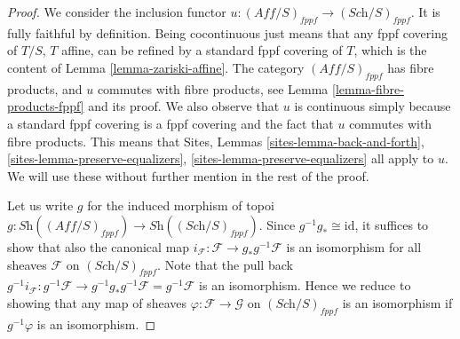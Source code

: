 \begin{proof}
We consider the inclusion functor
$u : (\textit{Aff}/S)_{fppf} \to (\textit{Sch}/S)_{fppf}$.
It is fully faithful by definition. Being cocontinuous
just means that any fppf covering of $T/S$, $T$ affine,
can be refined by a standard fppf covering of $T$, which
is the content of Lemma \ref{lemma-zariski-affine}.
The category $(\textit{Aff}/S)_{fppf}$ has fibre products, and $u$ commutes
with fibre products, see Lemma \ref{lemma-fibre-products-fppf}
and its proof.
We also observe that $u$ is continuous
simply because a standard fppf covering is a fppf covering
and the fact that $u$ commutes with fibre products.
This means that
Sites, Lemmas \ref{sites-lemma-back-and-forth},
\ref{sites-lemma-preserve-equalizers},
\ref{sites-lemma-preserve-equalizers} all apply to $u$.
We will use these without further mention in the rest of the proof.

\medskip\noindent
Let us write $g$ for the induced morphism of topoi
$g : \textit{Sh}((\textit{Aff}/S)_{fppf}) \to
\textit{Sh}((\textit{Sch}/S)_{fppf})$.
Since $g^{-1}g_* \cong \text{id}$, it suffices to show that
also the canonical map
$i_{\mathcal{F}} : \mathcal{F} \to g_* g^{-1} \mathcal{F}$
is an isomorphism for all sheaves $\mathcal{F}$ on
$(\textit{Sch}/S)_{fppf}$. Note that the pull back
$g^{-1}i_{\mathcal{F}} : g^{-1} \mathcal{F} \to
g^{-1} g_* g^{-1} \mathcal{F} = g^{-1} \mathcal{F}$
is an isomorphism. Hence we reduce to showing that any
map of sheaves $\varphi : \mathcal{F} \to \mathcal{G}$ on
$(\textit{Sch}/S)_{fppf}$ is an isomorphism if $g^{-1}\varphi$
is an isomorphism.


\end{proof}
